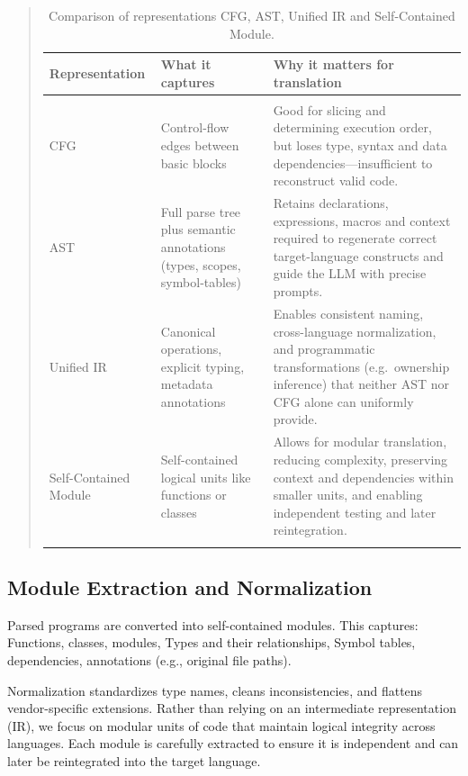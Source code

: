 \documentclass[twocolumn]{article}
\begin{document}
\begin{table}[!t]
    \caption{Comparison of representations CFG, AST, Unified IR and Self-Contained Module.}
\begin{quote}
\begin{tabular}{p{3cm}p{5cm}p{7cm}}
\bf Representation & \bf What it captures & \bf Why it matters for translation \\\hline
\\
CFG & Control-flow edges between basic blocks  
 & Good for slicing and determining execution order, but loses type, syntax and data dependencies—insufficient to reconstruct valid code. \\
AST & Full parse tree plus semantic annotations (types, scopes, symbol‐tables)  
 & Retains declarations, expressions, macros and context required to regenerate correct target-language constructs and guide the LLM with precise prompts. \\
Unified IR & Canonical operations, explicit typing, metadata annotations  
 & Enables consistent naming, cross-language normalization, and programmatic transformations (e.g.\ ownership inference) that neither AST nor CFG alone can uniformly provide. \\
 Self-Contained Module & Self-contained logical units like functions or classes  
 & Allows for modular translation, reducing complexity, preserving context and dependencies within smaller units, and enabling independent testing and later reintegration. \\
 \bigskip
\end{tabular}
\end{quote}
\end{table}


\subsection{Module Extraction and Normalization}

Parsed programs are converted into self-contained modules. This captures:
Functions, classes, modules,
Types and their relationships, 
Symbol tables, dependencies, annotations (e.g., original file paths).

Normalization standardizes type names, cleans inconsistencies, and flattens vendor-specific extensions. Rather than relying on an intermediate representation (IR), we focus on modular units of code that maintain logical integrity across languages. Each module is carefully extracted to ensure it is independent and can later be reintegrated into the target language.
\end{document}
